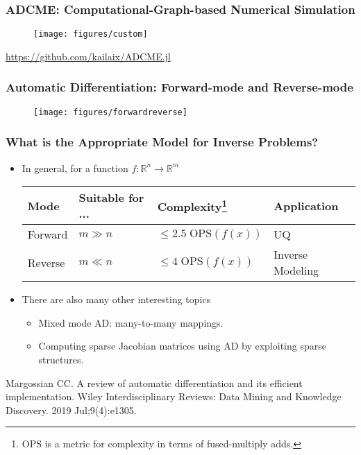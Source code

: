 \documentclass[usenames,dvipsnames]{beamer}
\newcommand{\RR}[0]{\mathbb{R}}
\begin{document}
\begin{frame}
	\frametitle{ADCME: Computational-Graph-based Numerical Simulation}
	
	\begin{figure}[hbt]
		\texttt{[image: figures/custom]}
	\end{figure}
\vspace{-0.8cm}
\begin{center}
\url{https://github.com/kailaix/ADCME.jl}
\end{center}
\end{frame}


\begin{frame}
	\frametitle{Automatic Differentiation: Forward-mode and Reverse-mode}
	\begin{figure}
		\centering
		\texttt{[image: figures/forwardreverse]}
	\end{figure}
\end{frame}


\begin{frame}
	\frametitle{What is the Appropriate Model for Inverse Problems?}
	
	\begin{itemize}
		\item In general, for a function $f:\RR^n \rightarrow \RR^m$
		\begin{table}[]
			\centering
			\begin{tabular}{@{}llll@{}}
				\toprule
				Mode & Suitable for ... & Complexity\footnote{$\mathrm{OPS}$ is a metric for complexity in terms of fused-multiply adds.} & Application \\ \midrule
				Forward & $m\gg n$ & $\leq 2.5\;\mathrm{OPS}(f(x))$ & UQ \\
				Reverse & $m\ll n$ & $\leq 4\;\mathrm{OPS}(f(x))$ & Inverse Modeling \\ \bottomrule
			\end{tabular}
		\end{table}
		
		
		\item There are also many other interesting topics
		\begin{itemize}
			\item Mixed mode AD: many-to-many mappings.
			\item Computing sparse Jacobian matrices using AD by exploiting sparse structures. 
		\end{itemize}
	\end{itemize}
	{\scriptsize Margossian CC. A review of automatic differentiation and its efficient implementation. Wiley Interdisciplinary Reviews: Data Mining and Knowledge Discovery. 2019 Jul;9(4):e1305.} 
\end{frame}
\end{document}
